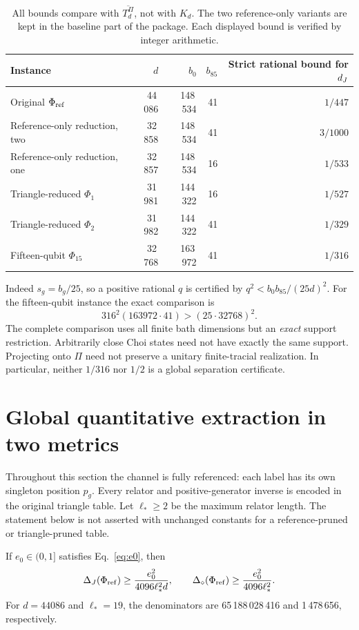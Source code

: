 \begin{table}[ht]
\centering\small
\begin{tabular}{@{}lrrrr@{}}
\toprule
Instance & $d$ & $b_0$ & $b_{85}$ & Strict rational bound for $d_J$\\
\midrule
Original $\Phi_{\mathrm{ref}}$ & 44\,086 & 148\,534 & 41 & $1/447$\\
Reference-only reduction, two & 32\,858 & 148\,534 & 41 & $3/1000$\\
Reference-only reduction, one & 32\,857 & 148\,534 & 16 & $1/533$\\
Triangle-reduced $\Phi_1$ & 31\,981 & 144\,322 & 16 & $1/527$\\
Triangle-reduced $\Phi_2$ & 31\,982 & 144\,322 & 41 & $1/329$\\
Fifteen-qubit $\Phi_{15}$ & 32\,768 & 163\,972 & 41 & $1/316$\\
\bottomrule
\end{tabular}
\caption{All bounds compare with $\overline{T_d^\Pi}$, not with $K_d$.
The two reference-only variants are kept in the baseline part of the package. Each displayed bound is verified by integer arithmetic.}
\label{tab:gaps}
\end{table}

Indeed $s_g=b_g/25$, so a positive rational $q$ is certified by
$q^2<b_0b_{85}/(25d)^2$. For the fifteen-qubit instance the exact comparison is
\[
 316^2(163972\cdot41)>(25\cdot32768)^2.
\]
The complete comparison uses all finite bath dimensions but an \emph{exact} support
restriction. Arbitrarily close Choi states need not have exactly the same support.
Projecting onto $\Pi$ need not preserve a unitary finite-tracial realization. In particular,
neither $1/316$ nor $1/2$ is a global separation certificate.

\section{Global quantitative extraction in two metrics}\label{sec:quantitative}

Throughout this section the channel is fully referenced: each label has its own singleton
position $p_g$. Every relator and positive-generator inverse is encoded in the original
triangle table. Let $\ell_*\ge2$ be the maximum relator length. The statement below is
not asserted with unchanged constants for a reference-pruned or triangle-pruned table.

\begin{theorem}\label{thm:quantitative}
If $e_0\in(0,1]$ satisfies Eq.~\eqref{eq:e0}, then
\begin{equation}
 \Delta_J(\Phi_{\mathrm{ref}})\ge\frac{e_0^2}{4096\ell_*^2d},
 \qquad
 \Delta_\diamond(\Phi_{\mathrm{ref}})\ge\frac{e_0^2}{4096\ell_*^2}.
 \label{eq:quantitative-bounds}
\end{equation}
For $d=44086$ and $\ell_*=19$, the denominators are 65\,188\,028\,416 and 1\,478\,656,
respectively.
\end{theorem}

